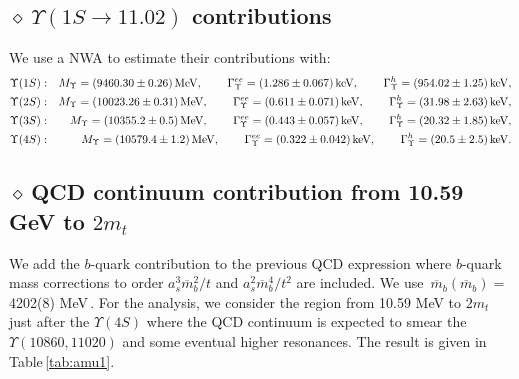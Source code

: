 \documentclass[review]{elsarticle}
\def\bea{\begin{eqnarray}}
\def\eea{\end{eqnarray}}
\def\nnb{\nonumber}
\def\nnb{\nonumber}
\def\d{$\diamond~$}
\begin{document}
\subsection*{ \vspace*{0.5cm} \d $\Upsilon(1S\to 11.02)$ contributions}
We use a NWA to estimate their contributions with:
\bea
\Upsilon(1S)&:&  M_\Upsilon=(9460.30\pm 0.26)\,{\rm MeV},\,\,\,\,\,\,        \,\,\,\,  \,\,\,\Gamma^{ee}_\Upsilon=(1.286\pm 0.067)\,{\rm keV},\,\,\,\,\,\,  \,\,\,\,\,  \,\,\Gamma^{h}_\Upsilon=(954.02\pm 1.25)\,{\rm keV} ,\nnb\\
\Upsilon(2S)&:&  M_\Upsilon=(10023.26\pm 0.31)\,{\rm MeV},\,\,\,\,\,\,        \,\,\,\,  \,\,\,\Gamma^{ee}_\Upsilon=(0.611\pm 0.071)\,{\rm keV},\,\,\,\,\,\,  \,\,\,\,\,  \,\,\Gamma^{h}_\Upsilon=(31.98\pm 2.63)\,{\rm keV} ,\nnb\\
\Upsilon(3S)&:&  M_\Upsilon=(10355.2\pm 0.5)\,{\rm MeV},\,\,\,\,\,\,        \,\,\,\,  \,\,\,\Gamma^{ee}_\Upsilon=(0.443\pm 0.057)\,{\rm keV},\,\,\,\,\,\,  \,\,\,\,\,  \,\,\Gamma^{h}_\Upsilon=(20.32\pm 1.85)\,{\rm keV} ,\nnb\\
\Upsilon(4S)&:&  M_\Upsilon=(10579.4\pm 1.2)\,{\rm MeV},\,\,\,\,\,\,        \,\,\,\,  \,\,\,\Gamma^{ee}_\Upsilon=(0.322\pm 0.042)\,{\rm keV},\,\,\,\,\,\,  \,\,\,\,\,  \,\,\Gamma^{h}_\Upsilon=(20.5\pm 2.5)\,{\rm keV} .
\eea
\subsection*{ \vspace*{0.5cm} \d QCD continuum contribution from  10.59 GeV to $2m_t$}
We add the $b$-quark contribution to the previous QCD expression where $b$-quark mass corrections to order $a_s^3\overline{m}_b^2/t$ and $a_s^2\overline{m}_b^4/t^2$ are included. We use\,\: $\overline{m}_b(\overline{m}_b)=$ 4202(8) MeV\,\cite{SNREV1}.
For the analysis, we consider the region from 10.59 MeV to $2m_t$ just after the $\Upsilon(4S)$ where the QCD continuum is expected to smear the  $\Upsilon(10860, 11020)$  and some eventual  higher resonances. The result is given in Table\,\ref{tab:amu1}. 
\end{document}
